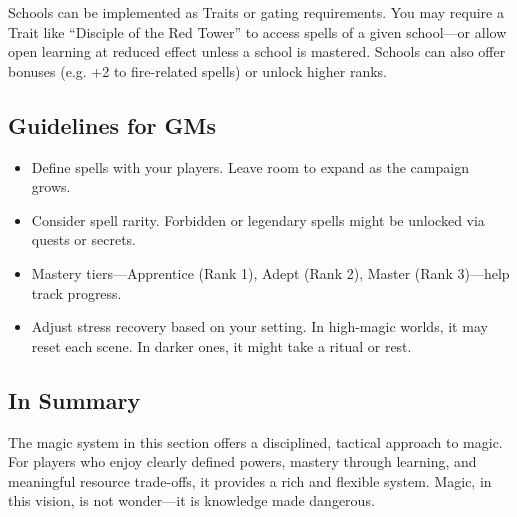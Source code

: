 Schools can be implemented as Traits or gating requirements. You may require a Trait like “Disciple of the Red Tower” to access spells of a given school—or allow open learning at reduced effect unless a school is mastered. Schools can also offer bonuses (e.g. +2 to fire-related spells) or unlock higher ranks.

\subsection{Guidelines for GMs}

\begin{itemize}
    \item Define spells with your players. Leave room to expand as the campaign grows.
    \item Consider spell rarity. Forbidden or legendary spells might be unlocked via quests or secrets.
    \item Mastery tiers—Apprentice (Rank 1), Adept (Rank 2), Master (Rank 3)—help track progress.
    \item Adjust stress recovery based on your setting. In high-magic worlds, it may reset each scene. In darker ones, it might take a ritual or rest.
\end{itemize}

\subsection{In Summary}

The magic system in this section offers a disciplined, tactical approach to magic. For players who enjoy clearly defined powers, mastery through learning, and meaningful resource trade-offs, it provides a rich and flexible system. Magic, in this vision, is not wonder—it is knowledge made dangerous.
